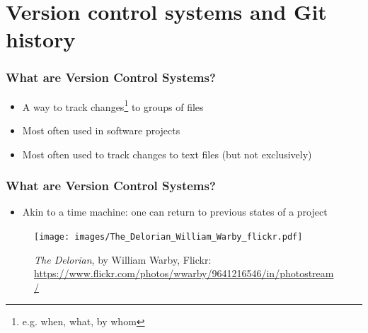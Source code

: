 \section{Version control systems and Git history}

\begin{frame}
\frametitle{What are Version Control Systems?}
\begin{itemize}

    \item A way to track changes\footnote[frame]{e.g. when, what, by whom} to groups of files
    \item Most often used in software projects
    \item Most often used to track changes to text files (but not
        exclusively)
\end{itemize}
\end{frame}

\begin{frame}[fragile]
\frametitle{What are Version Control Systems?}
\begin{itemize}
    \item Akin to a time machine: one can return to previous states of a
        project
\end{itemize}
\begin{figure}
    \centerline{%
    \texttt{[image: images/The\_Delorian\_William\_Warby\_flickr.pdf]}}
        \caption{\tiny \emph{The Delorian}, by William Warby, Flickr:
    \url{https://www.flickr.com/photos/wwarby/9641216546/in/photostream/}}
\end{figure}
\end{frame}

